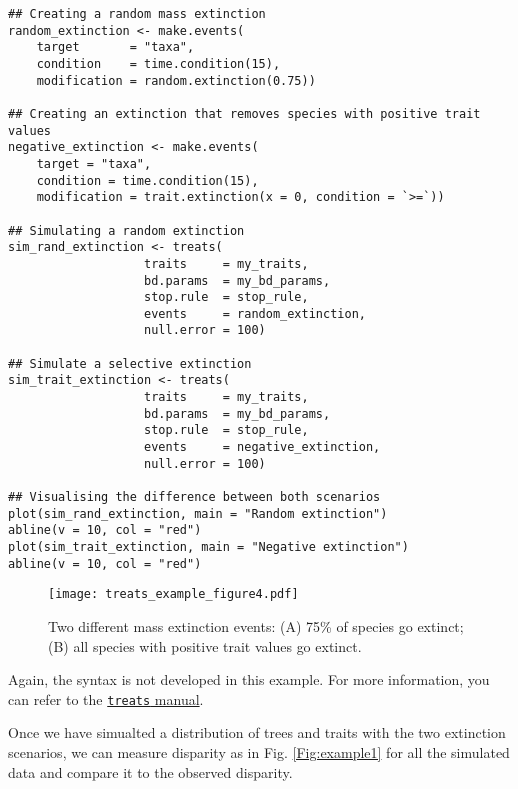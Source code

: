 \documentclass[12pt,letterpaper]{article}
\newcommand{\treats}{\texttt{treats} }
\begin{document}
\begin{lstlisting}
## Creating a random mass extinction
random_extinction <- make.events(
    target       = "taxa",
    condition    = time.condition(15),
    modification = random.extinction(0.75))

## Creating an extinction that removes species with positive trait values
negative_extinction <- make.events(
    target = "taxa",
    condition = time.condition(15),
    modification = trait.extinction(x = 0, condition = `>=`))

## Simulating a random extinction
sim_rand_extinction <- treats(
                   traits     = my_traits,
                   bd.params  = my_bd_params,
                   stop.rule  = stop_rule,
                   events     = random_extinction,
                   null.error = 100)

## Simulate a selective extinction
sim_trait_extinction <- treats(
                   traits     = my_traits,
                   bd.params  = my_bd_params,
                   stop.rule  = stop_rule,
                   events     = negative_extinction,
                   null.error = 100)

## Visualising the difference between both scenarios
plot(sim_rand_extinction, main = "Random extinction")
abline(v = 10, col = "red")
plot(sim_trait_extinction, main = "Negative extinction")
abline(v = 10, col = "red")
\end{lstlisting}

\begin{figure}[!htbp]
\centering
   \texttt{[image: treats\_example\_figure4.pdf]} 
\caption{Two different mass extinction events: (A) 75\% of species go extinct; (B) all species with positive trait values go extinct.}
\label{Fig:example4}
\end{figure}

Again, the syntax is not developed in this example.
For more information, you can refer to the \href{http://tguillerme.github.io/treats.htm}{\treats manual}.

Once we have simualted a distribution of trees and traits with the two extinction scenarios, we can measure disparity as in Fig. \ref{Fig:example1} for all the simulated data and compare it to the observed disparity.
\end{document}
